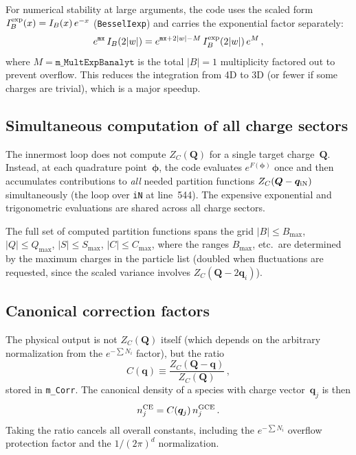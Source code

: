 \documentclass[11pt,a4paper]{article}
\newcommand{\bphi}{\bm{\phi}}
\newcommand{\bq}{\bm{q}}
\newcommand{\bQ}{\bm{Q}}
\begin{document}
For numerical stability at large arguments, the code uses the scaled form $I_B^{\rm exp}(x) = I_B(x)\,e^{-x}$ (\texttt{BesselIexp}) and carries the exponential factor separately:
\begin{equation}
  e^{\texttt{mx}}\,I_B(2|w|) = e^{\texttt{mx} + 2|w| - M}\,I_B^{\rm exp}(2|w|)\,e^{M}\,,
\end{equation}
where $M = \texttt{m\_MultExpBanalyt}$ is the total $|B|=1$ multiplicity factored out to prevent overflow.
This reduces the integration from 4D to 3D (or fewer if some charges are trivial), which is a major speedup.

\subsection{Simultaneous computation of all charge sectors}
\label{sec:simultaneous}

The innermost loop does not compute $Z_C(\bQ)$ for a single target charge~$\bQ$.
Instead, at each quadrature point~$\bphi$, the code evaluates $e^{F(\bphi)}$ once and then accumulates contributions to \emph{all} needed partition functions $Z_C(\bQ - \bq_{\rm iN})$ simultaneously (the loop over \texttt{iN} at line~544).
The expensive exponential and trigonometric evaluations are shared across all charge sectors.

The full set of computed partition functions spans the grid $|B| \leq B_{\max}$, $|Q| \leq Q_{\max}$, $|S| \leq S_{\max}$, $|C| \leq C_{\max}$, where the ranges $B_{\max}$, etc.\ are determined by the maximum charges in the particle list (doubled when fluctuations are requested, since the scaled variance involves $Z_C(\bQ - 2\bq_i)$).

\subsection{Canonical correction factors}
\label{sec:corr}

The physical output is not $Z_C(\bQ)$ itself (which depends on the arbitrary normalization from the $e^{-\sum N_i}$ factor), but the ratio
\begin{equation}\label{eq:corr}
  C(\bq) \equiv \frac{Z_C(\bQ - \bq)}{Z_C(\bQ)}\,,
\end{equation}
stored in \texttt{m\_Corr}.
The canonical density of a species with charge vector~$\bq_j$ is then
\begin{equation}
  n_j^{\rm CE} = C(\bq_j)\,n_j^{\rm GCE}\,.
\end{equation}
Taking the ratio cancels all overall constants, including the $e^{-\sum N_i}$ overflow protection factor and the $1/(2\pi)^d$ normalization.
\end{document}
